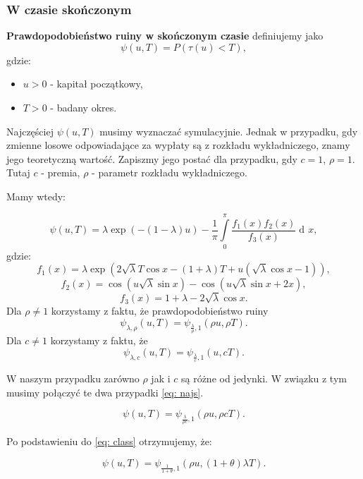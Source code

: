 \documentclass{article}
\theoremstyle{break}
\DeclareMathOperator{\diff}{d\!}
\numberwithin{equation}{subsection}
\numberwithin{figure}{section}
\begin{document}
\subsubsection{W czasie skończonym}

\textbf{Prawdopodobieństwo ruiny w skończonym czasie} definiujemy jako
\begin{equation}
\psi(u,T)=P(\tau(u)<T),
\end{equation}
gdzie:
\begin{itemize}
\item $u > 0$ - kapitał początkowy,
\item $T > 0$ - badany okres.
\end{itemize}

Najczęściej $\psi(u,T)$ musimy wyznaczać symulacyjnie. Jednak w przypadku, gdy zmienne losowe odpowiadające za wypłaty są z rozkładu wykładniczego, znamy jego teoretyczną wartość. Zapiszmy jego postać dla przypadku, gdy $c=1$, $\rho = 1$. \\
Tutaj $c$ - premia, $\rho$ - parametr rozkładu wykładniczego.

Mamy wtedy:

\begin{equation}
\psi(u,T)=\lambda \exp(-(1-\lambda)u)-\frac{1}{\pi} \int\limits_{0}^{\pi}\frac{f_1(x)f_2(x)}{f_3(x)}\diff{x}, \label{eq:ruina_teoretyczna}
\end{equation}
gdzie:
$$f_1(x)=\lambda \exp(2\sqrt{\lambda}T\cos x - (1+\lambda)T + u(\sqrt{\lambda}\cos x -1)),$$
$$f_2(x)=\cos(u\sqrt{\lambda}\sin x) - \cos(u\sqrt{\lambda}\sin x +2x),$$
$$f_3(x) = 1+\lambda - 2\sqrt{\lambda}\cos x.$$
Dla $\rho\ne1$ korzystamy z faktu, że prawdopodobieństwo ruiny
$$\psi_{\lambda,\rho}(u,T)=\psi_{\frac{\lambda}{\rho},1}(\rho u,\rho T).$$
Dla $c\ne 1$ korzystamy z faktu, że
$$\psi_{\lambda,c}(u,T)=\psi_{\frac{\lambda}{c},1}(u,cT).$$

W naszym przypadku zarówno $\rho$ jak i $c$ są różne od jedynki. W związku z tym musimy połączyć te dwa przypadki \eqref{eq: najs}.

\begin{equation}
\psi(u, T) = \psi_{\frac{\lambda}{\rho c}, 1}(\rho u, \rho cT). \label{eq: najs}
\end{equation}

Po podstawieniu do \eqref{eq: class} otrzymujemy, że:

\begin{equation}
\psi(u, T) = \psi_{\frac{1}{1+\theta}, 1}(\rho u, (1+\theta)\lambda T). \label{eq: najss}
\end{equation}
\end{document}
